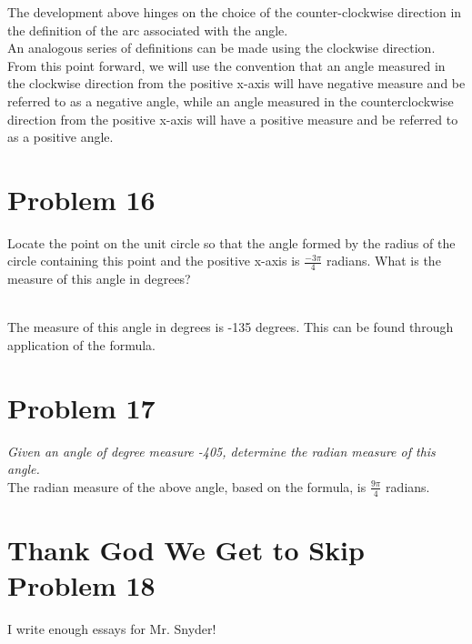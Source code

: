 \documentclass[11pt]{article} %
\newcommand\tab[1][1cm]{\hspace*{#1}}
\begin{document}
The development above hinges on the choice of the counter-clockwise direction in the definition of the arc associated with the angle. 
\\ \tab An analogous series of definitions can be made using the clockwise direction.
From this point forward, we will use the convention that an angle measured in the clockwise direction from the positive x-axis will have negative measure and be referred to as a negative angle, while an angle measured in the counterclockwise direction from the positive x-axis will have a positive measure and be referred to as a positive angle.

\section{Problem 16}
Locate the point on the unit circle so that the angle formed by the radius of the circle containing this point and the positive x-axis is $\frac{-3\pi}{4}$ radians. What is the measure of this angle in degrees? \\
\\The measure of this angle in degrees is -135 degrees. This can be found through application of the formula.

\section{Problem 17}
\textit{Given an angle of degree measure -405, determine the radian measure of this angle.} \\
\tab The radian measure of the above angle, based on the formula, is $\frac{9\pi}{4}$ radians.

\section{Thank God We Get to Skip Problem 18}
I write enough essays for Mr. Snyder! 
\end{document}
